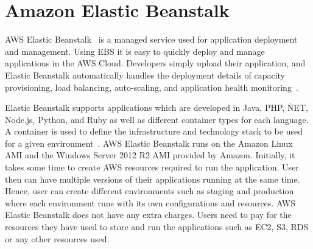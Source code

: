 \section{Amazon Elastic Beanstalk}

AWS Elastic Beanstalk~\cite{hid-sp18-420-amazon-elastic-beanstalk} is a managed
service used for application deployment and management. Using EBS it is easy to
quickly deploy and manage applications in the AWS Cloud. Developers simply
upload their application, and Elastic Beanstalk automatically handles the
deployment details of capacity provisioning, load balancing, auto-scaling, and
application health monitoring~\cite{hid-sp18-420-amazon-elastic-beanstalk-FAQ}.

Elastic Beanstalk supports applications which are developed in Java, PHP, \.NET,
Node.js, Python, and Ruby as well as different container types for each
language. A container is used to define the infrastructure and technology stack
to be used for a given
environment~\cite{hid-sp18-420-amazon-elastic-beanstalk-FAQ}. AWS Elastic
Beanstalk runs on the Amazon Linux AMI and the Windows Server 2012 R2 AMI
provided by Amazon. Initially, it takes some time to create AWS resources
required to run the application. User then can have multiple versions of their
applications running at the same time. Hence, user can create different
environments such as staging and production where each environment runs with its
own configurations and resources. AWS Elastic Beanstalk does not have any extra
charges. Users need to pay for the resources they have used to store and run the
applications such as EC2, S3, RDS or any other resources used.
